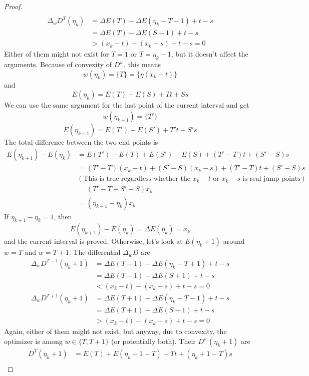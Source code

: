 \documentclass[]{article}
\begin{document}
\begin{proof}
\begin{align*}
	\end{align*}
	\begin{align*}
	\Delta_w D^{T }(\eta_k) &= \Delta E(T) - \Delta E(\eta_k - T - 1) + t - s\\
	&= \Delta E(T) - \Delta E(S - 1) + t - s\\
	&> (x_k - t) - (x_k - s) + t - s = 0
	\end{align*}
	Either of them might not exist for $T = 1$ or $T = \eta_k - 1$, but it doesn't affect the arguments. Because of convexity of $D^w$, this means
	\[
	w(\eta_k) = \{T\} = \{\eta(x_k-t)\}
	\]
	and
	\[
	E(\eta_k) = E(T) + E(S) + T t + S s
	\]
	We can use the same argument for the last point of the current interval and get
	\[
	w(\eta_{k+1}) = \{T'\}
	\]
	\[
	E(\eta_{k+1}) = E(T') + E(S') + T' t + S' s
	\]
	The total difference between the two end points is
	\begin{align*}
	E(\eta_{k+1}) - E(\eta_k) &= E(T') - E(T) + E(S') - E(S) + (T'-T)t + (S'-S)s\\
	&= (T'-T)(x_k-t) + (S'-S)(x_k-s) + (T'-T)t + (S'-S)s \quad \\
	&(\text{This is true regardless whether the $x_k-t$ or $x_k-s$ is real jump points})\\
	&=(T'-T + S' - S)x_k\\
	&=(\eta_{k+1} -\eta_k)x_k
	\end{align*}
	If $\eta_{k+1} -\eta_k = 1$, then
	\[
	E(\eta_{k+1}) - E(\eta_k) = \Delta E(\eta_k) = x_k
	\]
	and the current interval is proved. Otherwise, let's look at $E(\eta_k +1)$ around $w = T$ and $w = T+1$. The differential $\Delta_w D$ are
	\begin{align*}
	\Delta_w D^{T - 1}(\eta_k+1) &= \Delta E(T-1) - \Delta E(\eta_k - T + 1) + t - s\\
	&=\Delta E(T-1) - \Delta E(S + 1) + t - s\\
	&< (x_k - t) - (x_k -s) + t -s = 0
	\end{align*}
	\begin{align*}
	\Delta_w D^{T + 1}(\eta_k+1) &= \Delta E(T+1) - \Delta E(\eta_k - T - 1) + t - s\\
	&=\Delta E(T+1) - \Delta E(S - 1) + t - s\\
	&> (x_k - t) - (x_k -s) + t -s = 0
	\end{align*}
	Again, either of them might not exist, but anyway, due to convexity, the optimizer is among $w\in\{T, T+1\}$ (or potentially both). Their $D^w(\eta_k+1)$ are
	\begin{align*}
	D^T(\eta_k+1) &= E(T) + E(\eta_k+1-T) +Tt +(\eta_k+1-T)s \\

\end{align*}
\end{proof}
\end{document}
